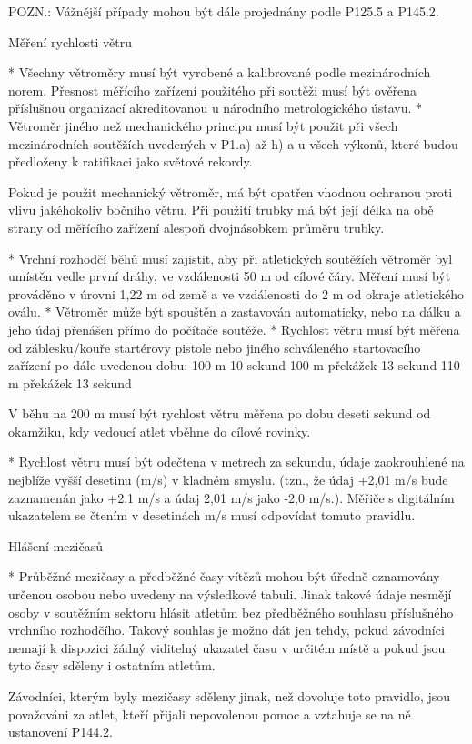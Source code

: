 POZN.: Vážnější případy mohou být dále projednány podle P125.5 a P145.2.

Měření rychlosti větru

* Všechny větroměry musí být vyrobené a kalibrované podle mezinárodních norem. Přesnost měřícího zařízení použitého při soutěži musí být ověřena příslušnou organizací akreditovanou u národního metrologického ústavu.
* Větroměr jiného než mechanického principu musí být použit při všech mezinárodních soutěžích uvedených v P1.a) až h) a u všech výkonů, které budou předloženy k ratifikaci jako světové rekordy.

Pokud je použit mechanický větroměr, má být opatřen vhodnou ochranou proti vlivu jakéhokoliv bočního větru. Při použití trubky má být její délka na obě strany od měřícího zařízení alespoň dvojnásobkem průměru trubky.

* Vrchní rozhodčí běhů musí zajistit, aby při atletických soutěžích větroměr byl umístěn vedle první dráhy, ve vzdálenosti 50 m od cílové čáry. Měření musí být prováděno v úrovni 1,22 m od země a ve vzdálenosti do 2 m od okraje atletického oválu.
* Větroměr může být spouštěn a zastavován automaticky, nebo na dálku a jeho údaj přenášen přímo do počítače soutěže.
* Rychlost větru musí být měřena od záblesku/kouře startérovy pistole nebo jiného schváleného startovacího zařízení po dále uvedenou dobu:
	100 m                           10 sekund
	100 m překážek           13 sekund
	110 m překážek           13 sekund

V běhu na 200 m musí být rychlost větru měřena po dobu deseti sekund od okamžiku, kdy vedoucí atlet vběhne do cílové rovinky.

* Rychlost větru musí být odečtena v metrech za sekundu, údaje zaokrouhlené na nejblíže vyšší desetinu (m/s) v kladném smyslu. (tzn., že údaj +2,01 m/s bude zaznamenán jako +2,1 m/s a údaj  2,01 m/s jako -2,0 m/s.). Měřiče s digitálním ukazatelem se čtením v desetinách m/s musí odpovídat tomuto pravidlu.

Hlášení mezičasů

* Průběžné mezičasy a předběžné časy vítězů mohou být úředně oznamovány určenou osobou nebo uvedeny na výsledkové tabuli. Jinak takové údaje nesmějí osoby v soutěžním sektoru hlásit atletům bez předběžného souhlasu příslušného vrchního rozhodčího. Takový souhlas je možno dát jen tehdy, pokud závodníci nemají k dispozici žádný viditelný ukazatel času v určitém místě a pokud jsou tyto časy sděleny i ostatním atletům.

Závodníci, kterým byly mezičasy sděleny jinak, než dovoluje toto pravidlo, jsou považováni za atlet, kteří přijali nepovolenou pomoc a vztahuje se na ně ustanovení P144.2.


